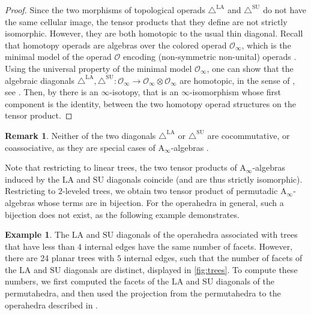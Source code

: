 \documentclass{amsart}
\theoremstyle{definition}
\newtheorem{example}[theorem]{Example}
\newtheorem{remark}[theorem]{Remark}
\newcommand{\SU}{\mathrm{SU}}
\newcommand{\LA}{\mathrm{LA}}
\newcommand{\SUD}{\triangle^{\mathrm{SU}}}
\newcommand{\LAD}{\triangle^{\mathrm{LA}}}
\newcommand{\Ainf}{\ensuremath{\mathrm{A}_\infty}}
\begin{document}
\begin{proof}
Since the two morphisms of topological operads $\LAD$ and $\SUD$ do not have the same cellular image, the tensor products that they define are not strictly isomorphic.
However, they are both homotopic to the usual thin diagonal.
Recall that homotopy operads are algebras over the colored operad $\mathcal{O}_\infty$, which is the minimal model of the operad $\mathcal{O}$ encoding (non-symmetric non-unital) operads \cite[Prop. 4.9]{LaplanteAnfossi}. 
Using the universal property of the minimal model $\mathcal{O}_\infty$, one can show that the algebraic diagonals $\LAD,\SUD : \mathcal{O}_\infty \to \mathcal{O}_\infty \otimes \mathcal{O}_\infty$ are homotopic, in the sense of \cite[Sec. 3.10]{MarklShniderStasheff}, see \cite[Prop. 3.136]{MarklShniderStasheff}.
Then, by \cite[Cor.~2]{DotsenkoShadrinVallette} there is an $\infty$-isotopy, that is an $\infty$-isomorphism whose first component is the identity, between the two homotopy operad structures on the tensor product.
\end{proof}

\begin{remark}
Neither of the two diagonals $\LAD$ or $\SUD$ are cocommutative, or coassociative, as they are special cases of $\Ainf$-algebras \cite[Thm. 13]{MarklShnider}. 
\end{remark}

Note that restricting to linear trees, the two tensor products of $\Ainf$-algebras induced by the $\LA$ and $\SU$ diagonals coincide (and are thus strictly isomorphic).
Restricting to $2$-leveled trees, we obtain two tensor product of permutadic $\Ainf$-algebras whose terms are in bijection.
For the operahedra in general, such a bijection does not exist, as the following example demonstrates. 

\begin{example}
\label{ex:operahedra-LA-SU}
The $\LA$ and $\SU$ diagonals of the operahedra associated with trees that have less than $4$ internal edges have the same number of facets. 
However, there are 24 planar trees with $5$ internal edges, such that the number of facets of the $\LA$ and $\SU$ diagonals are distinct, displayed in \cref{fig:trees}.
To compute these numbers, we first computed the facets of the $\LA$ and $\SU$ diagonals of the permutahedra, and then used the projection from the permutahedra to the operahedra described in \cite[Prop. 3.20]{LaplanteAnfossi}.
\end{example}
\end{document}
